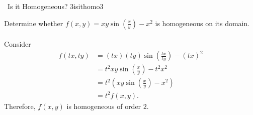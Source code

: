     \pagebreak
    \begin{example}{\Difficulty\,\Difficulty\,\,Is it Homogeneous? 3}{isithomo3}

        Determine whether \(f(x,y)=xy\sin\left(\frac{x}{y}\right)-x^2\) is homogeneous on its domain.
        \\
        \\
        Consider
        \begin{align*}
            f(tx,ty)&=(tx)(ty)\sin\left(\frac{tx}{ty}\right)-(tx)^2 \\
            &=t^2xy\sin\left(\frac{x}{y}\right)-t^2x^2 \\
            &=t^2(xy\sin\left(\frac{x}{y}\right)-x^2) \\
            &=t^2f(x,y).
        \end{align*}
        Therefore, \(f(x,y)\) is homogeneous of order \(2\).
    \end{example}
